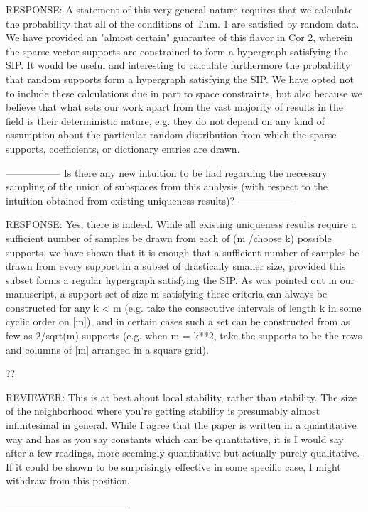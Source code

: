 RESPONSE: A statement of this very general nature requires that we calculate the probability that all of the conditions of Thm. 1 are satisfied by random data. We have provided an "almost certain" guarantee of this flavor in Cor 2, wherein the sparse vector supports are constrained to form a hypergraph satisfying the SIP. It would be useful and interesting to calculate furthermore the probability that random supports form a hypergraph satisfying the SIP. We have opted not to include these calculations due in part to space constraints, but also because we believe that what sets our work apart from the vast majority of results in the field is their deterministic nature, e.g. they do not depend on any kind of assumption about the particular random distribution from which the sparse supports, coefficients, or dictionary entries are drawn.

-----------------
Is there any new intuition to be had regarding the necessary sampling of the union of subspaces from this analysis (with respect to the intuition obtained from existing uniqueness results)?
-----------------

RESPONSE: Yes, there is indeed. While all existing uniqueness results require a sufficient number of samples be drawn from each of (m /choose k) possible supports, we have shown that it is enough that a sufficient number of samples be drawn from every support in a subset of drastically smaller size, provided this subset forms a regular hypergraph satisfying the SIP. As was pointed out in our manuscript, a support set of size m satisfying these criteria can always be constructed for any k < m (e.g. take the consecutive intervals of length k in some cyclic order on [m]), and in certain cases such a set can be constructed from as few as 2/sqrt(m) supports (e.g. when m = k**2, take the supports to be the rows and columns of [m] arranged in a square grid).

??

REVIEWER: 
This is at best about local stability, rather than stability. The size
of the neighborhood where you're getting stability is presumably almost
infinitesimal in general. While I agree that the paper is written in a
quantitative way and has as you say constants which can be quantitative, it
is I would say after a few readings, more
seemingly-quantitative-but-actually-purely-qualitative.
If it could be shown to be surprisingly effective in some specific case, I
might withdraw from this position.

-------------------------------------

